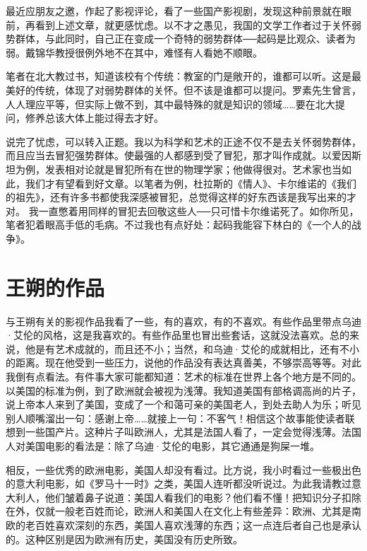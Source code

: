 最近应朋友之邀，作起了影视评论，看了一些国产影视剧，发现这种前景就在眼前，再看到上述文章，就更感忧虑。以不才之愚见，我国的文学工作者过于关怀弱势群体，与此同时，自己正在变成一个奇特的弱势群体──起码是比观众、读者为弱。戴锦华教授很例外地不在其中，难怪有人看她不顺眼。 

笔者在北大教过书，知道该校有个传统：教室的门是敞开的，谁都可以听。这是最美好的传统，体现了对弱势群体的关怀。但不该是谁都可以提问。罗素先生曾言，人人理应平等，但实际上做不到，其中最特殊的就是知识的领域……要在北大提问，修养总该大体上能过得去才好。 

说完了忧虑，可以转入正题。我以为科学和艺术的正途不仅不是去关怀弱势群体，而且应当去冒犯强势群体。使最强的人都感到受了冒犯，那才叫作成就。以爱因斯坦为例，发表相对论就是冒犯所有在世的物理学家；他做得很对。艺术家也当如此，我们才有望看到好文章。以笔者为例，杜拉斯的《情人》、卡尔维诺的《我们的祖先》，还有许多书都使我深感被冒犯，总觉得这样的好东西该是我写出来的才对。 我一直憋着用同样的冒犯去回敬这些人──只可惜卡尔维诺死了。如你所见，笔者犯着眼高手低的毛病。不过我也有点好处：起码我能容下林白的《一个人的战争》。

\chapter{王朔的作品}

与王朔有关的影视作品我看了一些，有的喜欢，有的不喜欢。有些作品里带点乌迪·艾伦的风格，这是我喜欢的。有些作品里也冒出些套话，这就没法喜欢。总的来说，他是有艺术成就的，而且还不小；当然，和乌迪·艾伦的成就相比，还有不小的距离。现在他受到一些压力，说他的作品没有表达真善美，不够崇高等等。对此我倒有点看法。有件事大家可能都知道：艺术的标准在世界上各个地方是不同的。以美国的标准为例，到了欧洲就会被视为浅薄。我知道美国有部格调高尚的片子，说上帝本人来到了美国，变成了一个和蔼可亲的美国老人，到处去助人为乐；听见别人顺嘴溜出一句：感谢上帝……就接上一句：不客气！相信这个故事能使读者联想到一些国产片。这种片子叫欧洲人，尤其是法国人看了，一定会觉得浅薄。法国人对美国电影的看法是：除了乌迪·艾伦的电影，其它通通是狗屎一堆。 

相反，一些优秀的欧洲电影，美国人却没有看过。比方说，我小时看过一些极出色的意大利电影，如《罗马十一时》之类，美国人连听都没听说过。为此我请教过意大利人，他们皱着鼻子说道：美国人看我们的电影？他们看不懂！把知识分子扣除在外，仅就一般老百姓而论，欧洲人和美国人在文化上有些差异：欧洲、尤其是南欧的老百姓喜欢深刻的东西，美国人喜欢浅薄的东西；这一点连后者自己也是承认的。这种区别是因为欧洲有历史，美国没有历史所致。 

